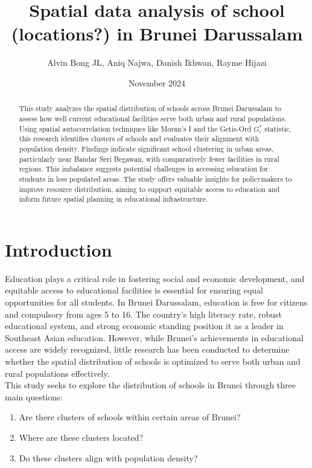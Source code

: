 \documentclass[12pt]{article}
\title{Spatial data analysis of school (locations?) in Brunei Darussalam }
\author{Alvin Bong JL, Aniq Najwa, Danish Ikhwan, Rayme Hijazi}
\date{November 2024}
\begin{document}
\maketitle
\begin{abstract}
This study analyzes the spatial distribution of schools across Brunei Darussalam to assess how well current educational facilities serve both urban and rural populations. Using spatial autocorrelation techniques like Moran’s I and the Getis-Ord \( G_i^* \) statistic, this research identifies clusters of schools and evaluates their alignment with population density. Findings indicate significant school clustering in urban areas, particularly near Bandar Seri Begawan, with comparatively fewer facilities in rural regions. This imbalance suggests potential challenges in accessing education for students in less populated areas. The study offers valuable insights for policymakers to improve resource distribution, aiming to support equitable access to education and inform future spatial planning in educational infrastructure. 
\end{abstract}


\section{Introduction}
Education plays a critical role in fostering social and economic development, and equitable access to educational facilities is essential for ensuring equal opportunities for all students. In Brunei Darussalam, education is free for citizens and compulsory from ages 5 to 16. The country’s high literacy rate, robust educational system, and strong economic standing position it as a leader in Southeast Asian education. However, while Brunei’s achievements in educational access are widely recognized, little research has been conducted to determine whether the spatial distribution of schools is optimized to serve both urban and rural populations effectively. \\

This study seeks to explore the distribution of schools in Brunei through three main questions:
\begin{enumerate}
    \item Are there clusters of schools within certain areas of Brunei?
    \item Where are these clusters located?
    \item Do these clusters align with population density?
\end{enumerate}
\end{document}
